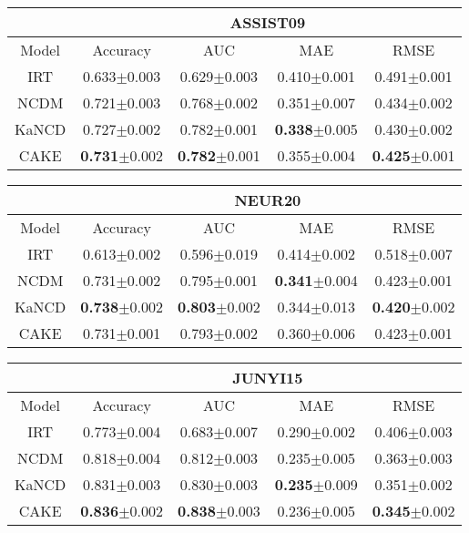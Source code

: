 \documentclass[letterpaper, 12pt, captions=tableabove]{scrreprt}
\begin{document}
		\begin{table}[htbp]
			\centering
			\begin{tabular}{ccccc}
				& \multicolumn{4}{c}{ASSIST09}\\ \hline
				Model&Accuracy&AUC&MAE&RMSE  \\ \hline
				IRT&0.633$\pm$0.003&0.629$\pm$0.003&0.410$\pm$0.001&0.491$\pm$0.001\\
				NCDM&0.721$\pm$0.003&0.768$\pm$0.002&0.351$\pm$0.007&0.434$\pm$0.002\\
				KaNCD&0.727$\pm$0.002&0.782$\pm$0.001&\textbf{0.338}$\pm$0.005&0.430$\pm$0.002\\
				CAKE&\textbf{0.731}$\pm$0.002&\textbf{0.782}$\pm$0.001&0.355$\pm$0.004&\textbf{0.425}$\pm$0.001\\
			\end{tabular}
		
			\begin{tabular}{ccccc}
				&\multicolumn{4}{c}{NEUR20}\\ \hline
				Model&Accuracy&AUC&MAE&RMSE  \\ \hline
				IRT&0.613$\pm$0.002&0.596$\pm$0.019&0.414$\pm$0.002&0.518$\pm$0.007\\
				NCDM&0.731$\pm$0.002&0.795$\pm$0.001&\textbf{0.341}$\pm$0.004&0.423$\pm$0.001\\
				KaNCD&\textbf{0.738}$\pm$0.002&\textbf{0.803}$\pm$0.002&0.344$\pm$0.013&\textbf{0.420}$\pm$0.002\\
				CAKE&0.731$\pm$0.001&0.793$\pm$0.002&0.360$\pm$0.006&0.423$\pm$0.001\\
			\end{tabular}
		
			\begin{tabular}{ccccc}
				&\multicolumn{4}{c}{JUNYI15}\\ \hline
				Model&Accuracy&AUC&MAE&RMSE  \\ \hline
				IRT&0.773$\pm$0.004&0.683$\pm$0.007&0.290$\pm$0.002&0.406$\pm$0.003\\
				NCDM&0.818$\pm$0.004&0.812$\pm$0.003&0.235$\pm$0.005&0.363$\pm$0.003\\
				KaNCD&0.831$\pm$0.003&0.830$\pm$0.003&\textbf{0.235}$\pm$0.009&0.351$\pm$0.002\\
				CAKE&\textbf{0.836}$\pm$0.002&\textbf{0.838}$\pm$0.003&0.236$\pm$0.005&\textbf{0.345}$\pm$0.002\\
			\end{tabular}
		

\end{table}
\end{document}
